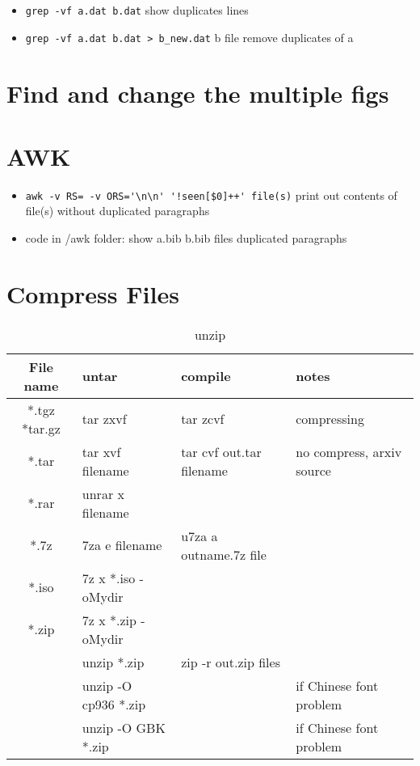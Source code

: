 \begin{itemize}
\item \verb|grep -vf a.dat b.dat| show duplicates lines    
\item \verb|grep -vf a.dat b.dat > b_new.dat| b file remove duplicates of a
\end{itemize}


\section{Find and change the multiple figs}

\section{AWK}
\begin{itemize}
\item\verb|awk -v RS= -v ORS='\n\n' '!seen[$0]++' file(s)| print out contents of file(s) without duplicated paragraphs
\item code in /awk folder: show a.bib b.bib files duplicated paragraphs
\end{itemize}

\section{Compress Files}
\begin{table}[ht]
\caption{unzip} %
\centering %
\begin{tabular}{c lll}
\hline\hline
File name & untar & compile & notes \\ [0.5ex]
\hline
*.tgz *tar.gz& tar zxvf  & tar zcvf & compressing \\
*.tar & tar xvf filename & tar cvf out.tar filename & no compress, arxiv source\\ [1ex] 
*.rar & unrar x filename & & \\
*.7z & 7za e filename & u7za a outname.7z file &\\
*.iso & 7z x *.iso -oMydir & &\\
*.zip & 7z x *.zip -oMydir & &\\
      & unzip *.zip        & zip -r out.zip files&\\
      & unzip -O cp936 *.zip & & if Chinese font problem\\
      & unzip -O GBK *.zip & & if Chinese font problem\\
\hline 
\end{tabular}
\label{table:nonlin}
\end{table}


